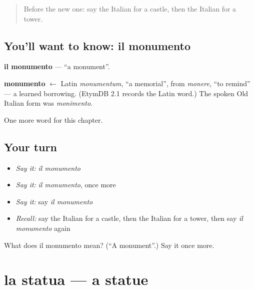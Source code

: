\label{lesson:IT-C228-monumento}



\begin{quote}
Before the new one: say the Italian for a castle, then the Italian for a tower.
\end{quote}

\subsection*{You'll want to know: il monumento}
\textbf{il monumento} — \textquotedblleft{}a monument\textquotedblright{}.

\begin{cousinweb}
\textbf{monumento} $\leftarrow$ Latin \emph{monumentum}, \textquotedblleft{}a memorial\textquotedblright{}, from \emph{monere}, \textquotedblleft{}to remind\textquotedblright{} — a learned borrowing. (EtymDB 2.1 records the Latin word.) The spoken Old Italian form was \emph{monimento}.
\end{cousinweb}

\begin{grammarlens}[title={What you've built}]
One more word for this chapter.
\end{grammarlens}

\subsection*{Your turn}
\begin{itemize}
\raggedright
  \item \emph{Say it:} \emph{il monumento}
  \item \emph{Say it:} \emph{il monumento}, once more
  \item \emph{Say it:} say \emph{il monumento}
  \item \emph{Recall:} say the Italian for a castle, then the Italian for a tower, then say \emph{il monumento} again
\end{itemize}

\begin{tcolorbox}[breakable,colback=teal!4,colframe=teal!35!black,title={Before you move on}]
What does il monumento mean? (\textquotedblleft{}A monument\textquotedblright{}.) Say it once more.
\end{tcolorbox}
\section[la statua]{la statua — a statue}

